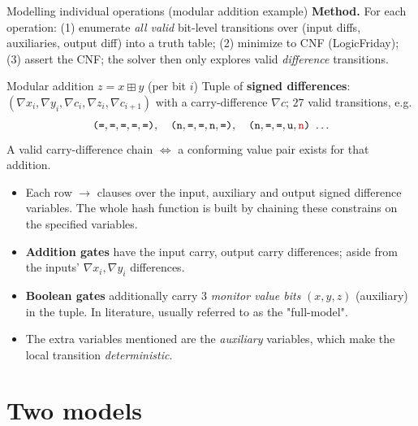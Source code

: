 \documentclass[aspectratio=169,9pt]{beamer}
\newcommand{\nn}{\texttt{n}}
\newcommand{\uu}{\texttt{u}}
\newcommand{\eq}{\texttt{=}}
\newcommand{\badd}{\boxplus}
\newcommand{\key}[1]{\textcolor{key}{\textbf{#1}}}
\newcommand{\hot}[1]{\textcolor{hot}{#1}}
\begin{document}
\begin{frame}{Modelling individual operations (modular addition example)}
\textbf{Method.} For each operation: (1) enumerate \emph{all valid} bit-level transitions over (input diffs, auxiliaries, output diff) into a truth table; (2) minimize to CNF (LogicFriday); (3) assert the CNF; the solver then only explores valid \emph{difference} transitions.
\begin{block}{Modular addition $z=x\badd y$ (per bit $i$)} Tuple of \key{signed differences}: $(\nabla x_i,\nabla y_i,\nabla c_i,\nabla z_i,\nabla c_{i+1})$ with a carry-difference $\nabla c$; $27$ valid transitions, e.g.
\[
\texttt{(}\eq,\eq,\eq,\eq,\eq\texttt{)},\quad \texttt{(}\nn,\eq,\eq,\nn,\eq\texttt{)},\quad \texttt{(}\nn,\eq,\eq,\uu,\hot{\nn}\texttt{)}\ \ldots
\]
A valid carry-difference chain $\Leftrightarrow$ a conforming value pair exists for that addition.
\end{block}
\begin{itemize}
  \item Each row $\to$ clauses over the input, auxiliary and output signed difference variables. The whole hash function is built by chaining these constrains on the specified variables.
  \item \textbf{Addition gates} have the input carry, output carry differences; aside from the inputs' $\nabla x_i, \nabla y_i$ differences. 
  \item \textbf{Boolean gates} additionally carry 3 \emph{monitor value bits} $(x,y,z)$ (auxiliary) in the tuple. In literature, usually referred to as the "full-model".
  \item The extra variables mentioned are the \emph{auxiliary} variables, which make the local transition \emph{deterministic}.
\end{itemize}
\end{frame}

\section{Two models}
\end{document}
